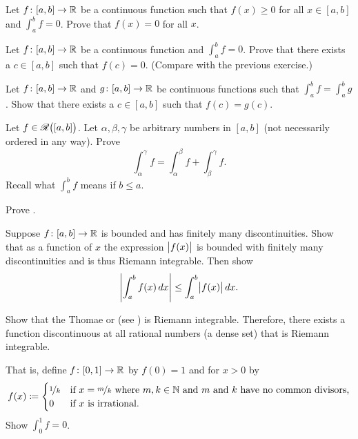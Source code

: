 \begin{exercise}
Let $f \colon [a,b] \to {\mathbb{R}}$ be a continuous function such that $f(x) \geq 0$
for all $x \in [a,b]$ and $\int_a^b f = 0$.  Prove that $f(x) = 0$
for all $x$.
\end{exercise}

\begin{exercise}
Let $f \colon [a,b] \to {\mathbb{R}}$ be a continuous function
and $\int_a^b f = 0$.  Prove that
there exists a $c \in [a,b]$ such that $f(c) = 0$. (Compare with the
previous exercise.)
\end{exercise}

\begin{exercise}
Let $f \colon [a,b] \to {\mathbb{R}}$ and $g \colon [a,b] \to {\mathbb{R}}$
be continuous functions such that $\int_a^b f = \int_a^b g$.
Show that there exists a $c \in [a,b]$ such that $f(c) = g(c)$.
\end{exercise}

\begin{exercise}
Let $f \in {\mathscr{R}}\bigl([a,b]\bigr)$.  Let $\alpha, \beta, \gamma$ be arbitrary numbers in
$[a,b]$ (not necessarily ordered in any way).  Prove 
\begin{equation*}
\int_\alpha^\gamma f =
\int_\alpha^\beta f +
\int_\beta^\gamma f .
\end{equation*}
Recall what $\int_a^b f$ means if $b \leq a$.
\end{exercise}

\begin{exercise}
Prove .
\end{exercise}

\begin{exercise} \label{exercise:easyabsint}
Suppose $f \colon [a,b] \to {\mathbb{R}}$ is bounded and
has finitely many discontinuities.
Show that as a function of $x$ the expression $\bigl\lvert {f(x)} \bigr\rvert$ is bounded with finitely many
discontinuities and is thus Riemann integrable.  Then show 
\begin{equation*}
\left\lvert {\int_a^b f(x)\,dx} \right\rvert \leq \int_a^b \bigl\lvert {f(x)} \bigr\rvert\,dx .
\end{equation*}
\end{exercise}

\begin{exercise}[Hard]
Show that the
Thomae or 
(see )
is Riemann integrable.  Therefore, there exists a
function discontinuous at all rational numbers (a dense set)
that is Riemann integrable.

That is,
define $f \colon [0,1] \to {\mathbb{R}}$ by $f(0)=1$ and for $x > 0$ by
\begin{equation*}
f(x) \coloneqq 
\begin{cases}
\nicefrac{1}{k} & \text{if } x=\nicefrac{m}{k} \text{ where }
m,k \in {\mathbb{N}} \text{ and } m \text{ and } k \text{ have no common divisors,} \\
0               & \text{if } x \text{ is irrational.}
\end{cases}
\end{equation*}
Show $\int_0^1 f = 0$.
\end{exercise}


